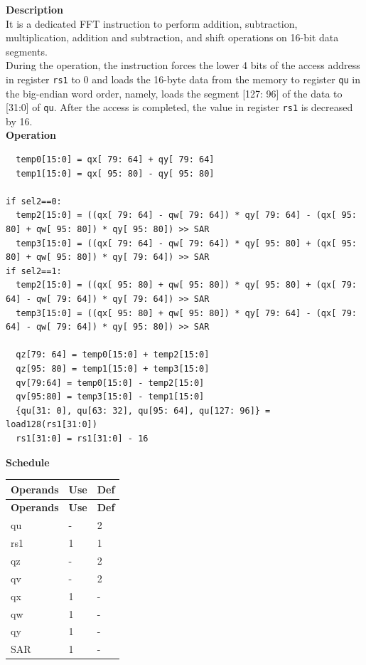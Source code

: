 \textbf{Description}\\
It is a dedicated FFT instruction to perform addition, subtraction, multiplication, addition and subtraction, and shift operations on 16-bit data segments.\\
During the operation, the instruction forces the lower 4 bits of the access address in register \lstinline{rs1} to 0 and loads the 16-byte data from the memory to register \lstinline{qu} in the big-endian word order, namely, loads the segment [127: 96] of the data to [31:0] of \lstinline{qu}. After the access is completed, the value in register \lstinline{rs1} is decreased by 16.\\
\textbf{Operation}
\begin{lstlisting}
  temp0[15:0] = qx[ 79: 64] + qy[ 79: 64]
  temp1[15:0] = qx[ 95: 80] - qy[ 95: 80]

if sel2==0:
  temp2[15:0] = ((qx[ 79: 64] - qw[ 79: 64]) * qy[ 79: 64] - (qx[ 95: 80] + qw[ 95: 80]) * qy[ 95: 80]) >> SAR
  temp3[15:0] = ((qx[ 79: 64] - qw[ 79: 64]) * qy[ 95: 80] + (qx[ 95: 80] + qw[ 95: 80]) * qy[ 79: 64]) >> SAR
if sel2==1:
  temp2[15:0] = ((qx[ 95: 80] + qw[ 95: 80]) * qy[ 95: 80] + (qx[ 79: 64] - qw[ 79: 64]) * qy[ 79: 64]) >> SAR
  temp3[15:0] = ((qx[ 95: 80] + qw[ 95: 80]) * qy[ 79: 64] - (qx[ 79: 64] - qw[ 79: 64]) * qy[ 95: 80]) >> SAR

  qz[79: 64] = temp0[15:0] + temp2[15:0]
  qz[95: 80] = temp1[15:0] + temp3[15:0]
  qv[79:64] = temp0[15:0] - temp2[15:0]
  qv[95:80] = temp3[15:0] - temp1[15:0]
  {qu[31: 0], qu[63: 32], qu[95: 64], qu[127: 96]} = load128(rs1[31:0])
  rs1[31:0] = rs1[31:0] - 16
\end{lstlisting}

\textbf{Schedule}\\
\begin{longtable}[c]{|l|l|l|}
    \hline
    \rowcolor{lightgray}
    \textbf{Operands} & \textbf{Use} & \textbf{Def} \\\hline
    \endfirsthead
    \hline
    \rowcolor{lightgray}
     \textbf{Operands} & \textbf{Use} & \textbf{Def} \\\hline
    \endhead
    \hline
    \endfoot

  qu & - & 2 \\\hline
  rs1 & 1 & 1 \\\hline
  qz & - & 2 \\\hline
  qv & - & 2 \\\hline
  qx & 1 & - \\\hline
  qw & 1 & - \\\hline
  qy & 1 & - \\\hline
  SAR & 1 & -

\end{longtable}

